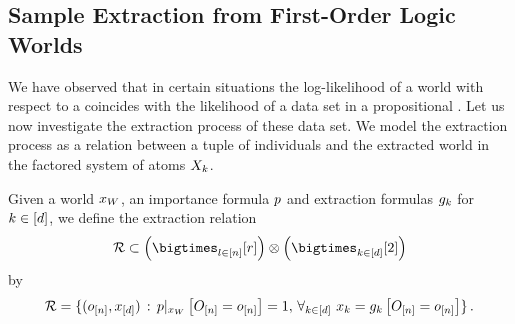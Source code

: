 \subsection{Sample Extraction from First-Order Logic Worlds}

We have observed that in certain situations the log-likelihood of a \firstOrderLogic{} world with respect to a \HybridFOLNetwork{} coincides with the likelihood of a data set in a propositional \HybridLogicNetwork{}.
Let us now investigate the extraction process of these data set.
We model the extraction process as a relation between a tuple of individuals and the extracted world in the factored system of atoms $X_{k}$.

\begin{definition}
    \label{def:extractionRelation}
    Given a \firstOrderLogic{} world $x_{W}$, an importance formula $p$ and extraction formulas $g_{k}$ for $k\in[d]$, we define the extraction relation
    \begin{align*}
        \extractionrelation \subset \left(\symindstates\right) \otimes \left(\atomstates\right)
    \end{align*}
    by
    \begin{align*}
        \mathcal{R}
        = \{ (o_{[n]}, x_{[d]})
        \,:\,  {p}|_{x_{W}} \left[O_{[n]}=o_{[n]}\right] = 1 ,\, \forall_{k\in[d]} \,\, {x_{k} = g_{k}\left[O_{[n]}=o_{[n]}\right]} \} \, .
    \end{align*}
\end{definition}

